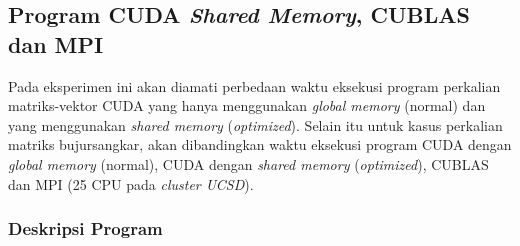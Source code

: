 \subsection{Program CUDA \textit{Shared Memory}, CUBLAS dan MPI} 

Pada eksperimen ini akan diamati perbedaan waktu eksekusi program perkalian matriks-vektor CUDA yang hanya menggunakan \textit{global memory} (normal) dan yang menggunakan \textit{shared memory} (\textit{optimized}). Selain itu untuk kasus perkalian matriks bujursangkar, akan dibandingkan waktu eksekusi program CUDA dengan \textit{global memory} (normal), CUDA dengan \textit{shared memory} (\textit{optimized}), CUBLAS dan MPI (25 CPU pada \textit{cluster UCSD}).

\subsubsection{Deskripsi Program}

